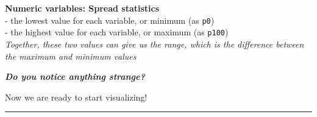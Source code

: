 \documentclass[11pt,]{article}
\begin{document}
\textbf{Numeric variables: Spread statistics}\\
- the lowest value for each variable, or minimum (as \texttt{p0})\\
- the highest value for each variable, or maximum (as \texttt{p100})\\
\emph{Together, these two values can give us the range, which is the
difference between the maximum and minimum values}

\textbf{\emph{Do you notice anything strange?}}

Now we are ready to start visualizing!

\begin{center}\rule{0.5\linewidth}{0.5pt}\end{center}
\end{document}
